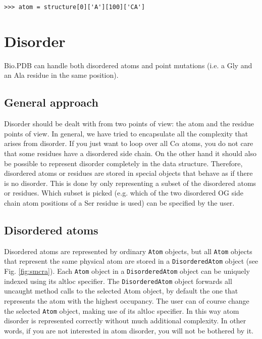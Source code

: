 \begin{verbatim}
>>> atom = structure[0]['A'][100]['CA']
\end{verbatim}

\section{Disorder}

Bio.PDB can handle both disordered atoms and point mutations (i.e. a
Gly and an Ala residue in the same position).

\subsection{General approach\label{disorder problems}}

Disorder should be dealt with from two points of view: the atom and the residue
points of view. In general, we have tried to encapsulate all the complexity that
arises from disorder. If you just want to loop over all C$\alpha$ atoms,
you do not care that some residues have a disordered side chain. On the other
hand it should also be possible to represent disorder completely in the data
structure. Therefore, disordered atoms or residues are stored in special objects
that behave as if there is no disorder. This is done by only representing a
subset of the disordered atoms or residues. Which subset is picked (e.g. which
of the two disordered OG side chain atom positions of a Ser residue is used)
can be specified by the user.

\subsection{Disordered atoms\label{disordered atoms}}

Disordered atoms are represented by ordinary \texttt{Atom} objects, but
all \texttt{Atom} objects that represent the same physical atom are stored
in a \texttt{Disordered\-Atom} object (see Fig. \ref{fig:smcra}).
Each \texttt{Atom} object in a \texttt{Disordered\-Atom} object can
be uniquely indexed using its altloc specifier. The \texttt{Disordered\-Atom}
object forwards all uncaught method calls to the selected Atom object,
by default the one that represents the atom with the highest
occupancy. The user can of course change the selected \texttt{Atom}
object, making use of its altloc specifier. In this way atom disorder
is represented correctly without much additional complexity. In other
words, if you are not interested in atom disorder, you will not be
bothered by it.

